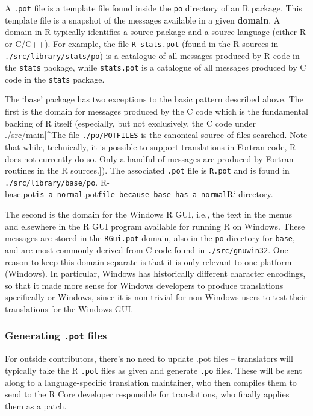 \documentclass[
]{book}
\begin{document}
A \texttt{.pot} file is a template file found inside the \texttt{po} directory of an R
package. This template file is a snapshot of the messages available in a
given \textbf{domain}. A domain in R typically identifies a source package
and a source language (either R or C/C++). For example, the file
\texttt{R-stats.pot} (found in the R sources in \texttt{./src/library/stats/po}) is a
catalogue of all messages produced by R code in the \texttt{stats} package,
while \texttt{stats.pot} is a catalogue of all messages produced by C code in
the \texttt{stats} package.

The `base' package has two exceptions to the basic pattern described
above. The first is the domain for messages produced by the C code which
is the fundamental backing of R itself (especially, but not exclusively,
the C code under ./src/main{[}\^{}The file \texttt{./po/POTFILES} is the canonical
source of files searched. Note that while, technically, it is possible
to support translations in Fortran code, R does not currently do so.
Only a handful of messages are produced by Fortran routines in the R
sources.{]}). The associated \texttt{.pot} file is \texttt{R.pot} and is found in
\texttt{./src/library/base/po}.
R-base.pot\texttt{is\ a\ normal}.pot\texttt{file\ because\ base\ has\ a\ normal}R`
directory.

The second is the domain for the Windows R GUI, i.e., the text in the
menus and elsewhere in the R GUI program available for running R on
Windows. These messages are stored in the \texttt{RGui.pot} domain, also in the
\texttt{po} directory for \texttt{base}, and are most commonly derived from C code
found in \texttt{./src/gnuwin32}. One reason to keep this domain separate is
that it is only relevant to one platform (Windows). In particular,
Windows has historically different character encodings, so that it made
more sense for Windows developers to produce translations specifically
or Windows, since it is non-trivial for non-Windows users to test their
translations for the Windows GUI.

\subsubsection{\texorpdfstring{Generating \texttt{.pot} files}{Generating .pot files}}\label{generating-.pot-files}

For outside contributors, there's no need to update .pot files --
translators will typically take the R \texttt{.pot} files as given and generate
\texttt{.po} files. These will be sent along to a language-specific translation
maintainer, who then compiles them to send to the R Core developer
responsible for translations, who finally applies them as a patch.
\end{document}

